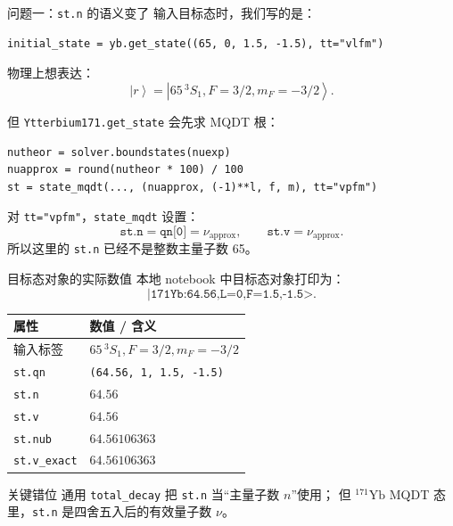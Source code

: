 \documentclass[aspectratio=169,11pt]{ctexbeamer}
\newcommand{\ket}[1]{\left|#1\right\rangle}
\begin{document}
\begin{frame}[fragile]{问题一：\texttt{st.n} 的语义变了}
  \small
  输入目标态时，我们写的是：
  \begin{verbatim}
initial_state = yb.get_state((65, 0, 1.5, -1.5), tt="vlfm")
  \end{verbatim}

  \vspace{-0.5em}
  物理上想表达：
  \[
    \ket{r}=\ket{65\,{}^3S_1,F=3/2,m_F=-3/2}.
  \]

  但 \texttt{Ytterbium171.get\_state} 会先求 MQDT 根：
  \begin{verbatim}
nutheor = solver.boundstates(nuexp)
nuapprox = round(nutheor * 100) / 100
st = state_mqdt(..., (nuapprox, (-1)**l, f, m), tt="vpfm")
  \end{verbatim}

  \vspace{-0.5em}
  对 \texttt{tt="vpfm"}，\texttt{state\_mqdt} 设置：
  \[
    \texttt{st.n}=\texttt{qn[0]}=\nu_{\mathrm{approx}},
    \qquad
    \texttt{st.v}=\nu_{\mathrm{approx}}.
  \]
  所以这里的 \texttt{st.n} 已经不是整数主量子数 65。
\end{frame}

\begin{frame}{目标态对象的实际数值}
  本地 notebook 中目标态对象打印为：
  \[
    \texttt{|171Yb:64.56,L=0,F=1.5,-1.5>}.
  \]

  \begin{table}
    \centering
    \small
    \begin{tabular}{ll}
      \toprule
      属性 & 数值 / 含义 \\
      \midrule
      输入标签 & \(65\,{}^3S_1,F=3/2,m_F=-3/2\) \\
      \texttt{st.qn} & \texttt{(64.56, 1, 1.5, -1.5)} \\
      \texttt{st.n} & \(64.56\) \\
      \texttt{st.v} & \(64.56\) \\
      \texttt{st.nub} & \(64.56106363\) \\
      \texttt{st.v\_exact} & \(64.56106363\) \\
      \bottomrule
    \end{tabular}
  \end{table}

  \begin{block}{关键错位}
    通用 \texttt{total\_decay} 把 \texttt{st.n} 当“主量子数 \(n\)”使用；
    但 \({}^{171}\mathrm{Yb}\) MQDT 态里，\texttt{st.n} 是四舍五入后的有效量子数 \(\nu\)。
  \end{block}
\end{frame}
\end{document}
